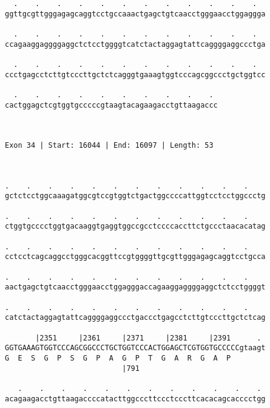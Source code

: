 \documentclass{article}
\begin{document}
\begin{Verbatim}
  .    .    .    .    .    .    .    .    .    .    .    .  
ggttgcgttgggagagcaggtcctgccaaactgagctgtcaacctgggaacctggaggga
                                                            
  .    .    .    .    .    .    .    .    .    .    .    .  
ccagaaggaggggaggctctcctggggtcatctactaggagtattcaggggaggccctga
                                                            
  .    .    .    .    .    .    .    .    .    .    .    .  
ccctgagcctcttgtcccttgctctcagggtgaaagtggtcccagcggccctgctggtcc
                                                            
  .    .    .    .    .    .    .    .    .    . 
cactggagctcgtggtgcccccgtaagtacagaagacctgttaagaccc
                                                 
                                                 
 
Exon 34 | Start: 16044 | End: 16097 | Length: 53



.    .    .    .    .    .    .    .    .    .    .    .    
gctctcctggcaaagatggcgtccgtggtctgactggccccattggtcctcctggccctg
                                                            
.    .    .    .    .    .    .    .    .    .    .    .    
ctggtgcccctggtgacaaggtgaggtggccgcctccccaccttctgccctaacacatag
                                                            
.    .    .    .    .    .    .    .    .    .    .    .    
cctcctcagcaggcctgggcacggttccgtggggttgcgttgggagagcaggtcctgcca
                                                            
.    .    .    .    .    .    .    .    .    .    .    .    
aactgagctgtcaacctgggaacctggagggaccagaaggaggggaggctctcctggggt
                                                            
.    .    .    .    .    .    .    .    .    .    .    .    
catctactaggagtattcaggggaggccctgaccctgagcctcttgtcccttgctctcag
                                                            
       |2351     |2361     |2371     |2381     |2391      . 
GGTGAAAGTGGTCCCAGCGGCCCTGCTGGTCCCACTGGAGCTCGTGGTGCCCCCgtaagt
G  E  S  G  P  S  G  P  A  G  P  T  G  A  R  G  A  P        
                           |791                             
  
   .    .    .    .    .    .    .    .    .    .    .    . 
acagaagacctgttaagaccccatacttggcccttccctcccttcacacagcacccctgg
                                                            

\end{Verbatim}
\end{document}
